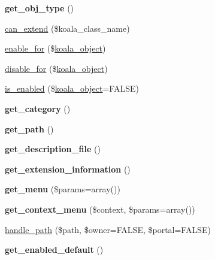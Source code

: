 \begin{DoxyCompactItemize}
\item 
\hypertarget{classkoala__extension_a9a107f212ed1f0f94cc6d2004f48973b}{
{\bfseries get\_\-obj\_\-type} ()}
\label{classkoala__extension_a9a107f212ed1f0f94cc6d2004f48973b}

\item 
\hyperlink{classkoala__extension_aa3c31c8c59ad902b3b59e9064915ef46}{can\_\-extend} (\$koala\_\-class\_\-name)
\item 
\hyperlink{classkoala__extension_af17a9ccb2bd03ef4e2c7b01bb1ec9393}{enable\_\-for} (\$\hyperlink{classkoala__object}{koala\_\-object})
\item 
\hyperlink{classkoala__extension_acfe34917f7809180cd5d924fbf465547}{disable\_\-for} (\$\hyperlink{classkoala__object}{koala\_\-object})
\item 
\hyperlink{classkoala__extension_a5bbf293fb4721b68594f821fe50f75c3}{is\_\-enabled} (\$\hyperlink{classkoala__object}{koala\_\-object}=FALSE)
\item 
\hypertarget{classkoala__extension_a0bbf0b09847862f4d09fe68db5167fbf}{
{\bfseries get\_\-category} ()}
\label{classkoala__extension_a0bbf0b09847862f4d09fe68db5167fbf}

\item 
\hypertarget{classkoala__extension_a7209c30c22e4410e043520e6b7642740}{
{\bfseries get\_\-path} ()}
\label{classkoala__extension_a7209c30c22e4410e043520e6b7642740}

\item 
\hypertarget{classkoala__extension_aa6a00c3172ba228a5147cb722a6b2ced}{
{\bfseries get\_\-description\_\-file} ()}
\label{classkoala__extension_aa6a00c3172ba228a5147cb722a6b2ced}

\item 
\hypertarget{classkoala__extension_a3d2ccbfe12ccd69043bd316b898b8fea}{
{\bfseries get\_\-extension\_\-information} ()}
\label{classkoala__extension_a3d2ccbfe12ccd69043bd316b898b8fea}

\item 
\hypertarget{classkoala__extension_a7f32e026de97a7cd768c2bcab5b813c7}{
{\bfseries get\_\-menu} (\$params=array())}
\label{classkoala__extension_a7f32e026de97a7cd768c2bcab5b813c7}

\item 
\hypertarget{classkoala__extension_a0e09a1792405a98bab808b66fcb32fd3}{
{\bfseries get\_\-context\_\-menu} (\$context, \$params=array())}
\label{classkoala__extension_a0e09a1792405a98bab808b66fcb32fd3}

\item 
\hyperlink{classkoala__extension_a844337be77e8722f004c2b67b3c927f7}{handle\_\-path} (\$path, \$owner=FALSE, \$portal=FALSE)
\item 
\hypertarget{classkoala__extension_a5751bb903b120b16da23fe738ef864de}{
{\bfseries get\_\-enabled\_\-default} ()}
\label{classkoala__extension_a5751bb903b120b16da23fe738ef864de}


\end{DoxyCompactItemize}
